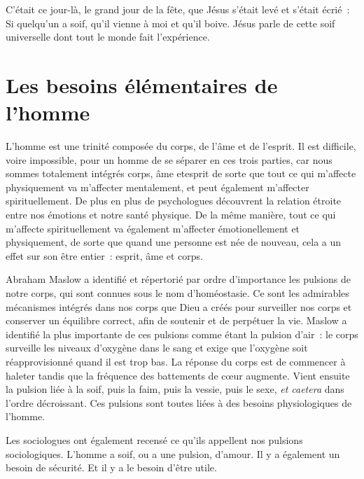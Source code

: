\begin{specialpar}{}
C'était ce jour-là, le grand jour de la fête, que Jésus s'était levé
 et s'était écrié~:
 \og Si quelqu'un a soif, qu'il vienne à moi et qu'il boive. \fg{}
 Jésus parle de cette soif universelle dont tout le monde fait l'expérience.
\end{specialpar}


\section*{Les besoins élémentaires de l'homme}


\begin{specialpar}{}
L'homme est une trinité composée du corps, de l'âme et de l'esprit.
 Il est difficile, voire impossible, pour un homme de se séparer
 en ces trois parties, car nous sommes totalement intégrés
 \ocadr corps, âme et\linebreak esprit \fcadr{} de sorte
 que tout ce qui m'affecte
 physiquement va m'affecter mentalement, et peut également m'affecter
 spirituellement.
 De plus en plus de psychologues découvrent la relation étroite
 entre nos émotions et notre santé physique.
 De la même manière, tout ce qui m'affecte spirituellement
 va également m'affecter émotionellement et physiquement,
 de sorte que quand une personne est née de nouveau,
 cela a un effet sur son être entier~: esprit, âme et corps.
\end{specialpar}

Abraham Maslow a identifié et répertorié par ordre d'importance
 les pulsions de notre corps, qui sont connues sous le nom d'homéo\-stasie.
 Ce sont les admirables mécanismes intégrés dans nos corps que Dieu
 a créés pour surveiller nos corps et conserver un équilibre correct,
 afin de soutenir et de perpétuer la vie.
 Maslow a identifié la plus importante de ces pulsions comme étant
 la pulsion d'air~: le corps surveille les niveaux d'oxygène dans le sang
 et exige que l'oxygène soit réapprovisionné quand il est trop bas.
 La réponse du corps est de commencer à haleter tandis que la fréquence
 des battements de cœur augmente.
 Vient ensuite la pulsion liée à la soif, puis la faim, puis la vessie,
 puis le sexe, \emph{et caetera} dans l'ordre décroissant.
 Ces pulsions sont toutes liées à des besoins physiologiques de l'homme.

Les sociologues ont également recensé ce qu'ils appellent nos pulsions
 sociologiques. L'homme a soif, ou a une pulsion, d'amour.
 Il y a également un besoin de sécurité. Et il y a le besoin d'être utile.

